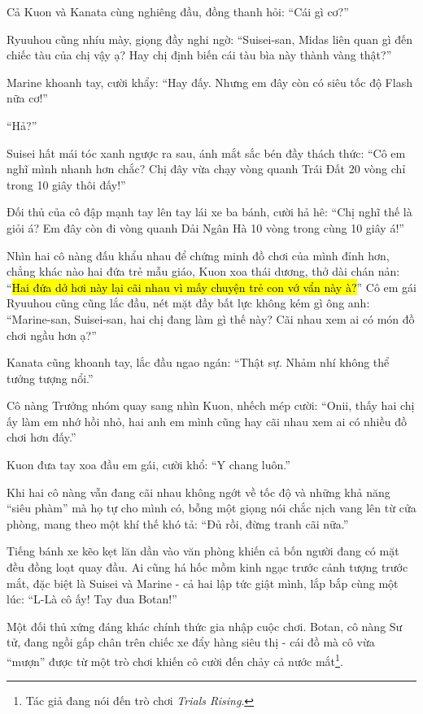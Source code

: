 \documentclass[../main.tex]{subfiles}
\begin{document}
Cả Kuon và Kanata cùng nghiêng đầu, đồng thanh hỏi: ``Cái gì cơ?''

Ryuuhou cũng nhíu mày, giọng đầy nghi ngờ: ``Suisei-san, Midas liên quan gì đến chiếc tàu của chị vậy ạ? Hay chị định biến cái tàu bìa này thành vàng thật?''

Marine khoanh tay, cười khẩy: ``Hay đấy. Nhưng em đây còn có siêu tốc độ Flash nữa cơ!''

``Hả?''

Suisei hất mái tóc xanh ngược ra sau, ánh mắt sắc bén đầy thách thức: ``Cô em nghĩ mình nhanh hơn chắc? Chị đây vừa chạy vòng quanh Trái Đất 20 vòng chỉ trong 10 giây thôi đấy!''

Đối thủ của cô đập mạnh tay lên tay lái xe ba bánh, cười hả hê: ``Chị nghĩ thế là giỏi á? Em đây còn đi vòng quanh Dải Ngân Hà 10 vòng trong cùng 10 giây á!''

Nhìn hai cô nàng đấu khẩu nhau để chứng minh đồ chơi của mình đỉnh hơn, chẳng khác nào hai đứa trẻ mẫu giáo, Kuon xoa thái dương, thở dài chán nản: ``\hl{Hai đứa dở hơi này lại cãi nhau vì mấy chuyện trẻ con vớ vẩn này à?}'' Cô em gái Ryuuhou cũng cũng lắc đầu, nét mặt đầy bất lực không kém gì ông anh: ``Marine-san, Suisei-san, hai chị đang làm gì thế này? Cãi nhau xem ai có món đồ chơi ngầu hơn ạ?''

Kanata cũng khoanh tay, lắc đầu ngao ngán: ``Thật sự. Nhảm nhí không thể tưởng tượng nổi.''

Cô nàng Trưởng nhóm quay sang nhìn Kuon, nhếch mép cười: ``Onii, thấy hai chị ấy làm em nhớ hồi nhỏ, hai anh em mình cũng hay cãi nhau xem ai có nhiều đồ chơi hơn đấy.''

Kuon đưa tay xoa đầu em gái, cười khổ: ``Y chang luôn.''

Khi hai cô nàng vẫn đang cãi nhau không ngớt về tốc độ và những khả năng ``siêu phàm'' mà họ tự cho mình có, bỗng một giọng nói chắc nịch vang lên từ cửa phòng, mang theo một khí thế khó tả: ``Đủ rồi, đừng tranh cãi nữa.''

Tiếng bánh xe kẽo kẹt lăn dần vào văn phòng khiến cả bốn người đang có mặt đều đồng loạt quay đầu. Ai cũng há hốc mồm kinh ngạc trước cảnh tượng trước mắt, đặc biệt là Suisei và Marine - cả hai lập tức giật mình, lắp bắp cùng một lúc: ``L-Là cô ấy! Tay đua Botan!''

Một đối thủ xứng đáng khác chính thức gia nhập cuộc chơi. Botan, cô nàng Sư tử, đang ngồi gấp chân trên chiếc xe đẩy hàng siêu thị - cái đồ mà cô vừa ``mượn'' được từ một trò chơi khiến cô cười đến chảy cả nước mắt\footnote{Tác giả đang nói đến trò chơi \textit{Trials Rising}.}.
\end{document}
